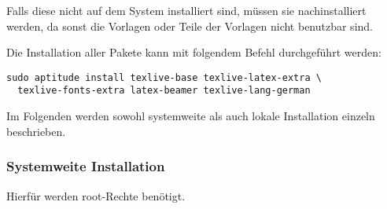 Falls diese nicht auf dem System installiert sind, müssen sie nachinstalliert
werden, da sonst die Vorlagen oder Teile der Vorlagen nicht benutzbar sind.

Die Installation aller Pakete kann mit folgendem Befehl durchgeführt werden:
\begin{lstlisting}[style=cmd]
sudo aptitude install texlive-base texlive-latex-extra \
  texlive-fonts-extra latex-beamer texlive-lang-german
\end{lstlisting}

Im Folgenden werden sowohl systemweite als auch lokale Installation einzeln
beschrieben.

\subsubsection{Systemweite Installation}

\begin{important}
  Hierfür werden root-Rechte benötigt.
\end{important}

